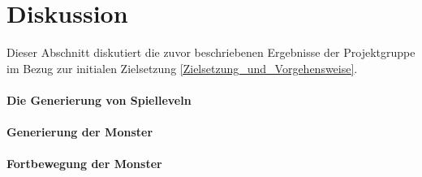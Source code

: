 \section{Diskussion}
\label{Diskussion}

Dieser Abschnitt diskutiert die zuvor beschriebenen Ergebnisse der Projektgruppe im Bezug zur initialen Zielsetzung \ref{Zielsetzung_und_Vorgehensweise}.

\paragraph{Die Generierung von Spielleveln}

\paragraph{Generierung der Monster}

\paragraph{Fortbewegung der Monster}
